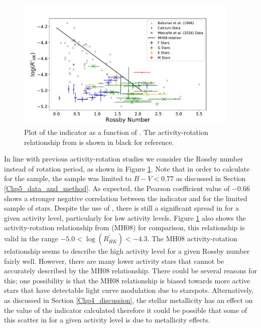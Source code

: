 \begin{figure}
    \centering
    \includegraphics[width=0.95\textwidth]{Figures/5-Activity_rotation/rhk_v_r0.pdf}
    \caption[\Rprime indicator as a function of \Ro]{Plot of the \Rprime indicator as a function of \Ro. The activity-rotation relationship from \citet{Mamajek_Hillenbrand_2008} is shown in black for reference.}
    \label{fig:rhk_v_ro}
\end{figure}

In line with previous activity-rotation studies \citep{Mamajek_Hillenbrand_2008,Metcalfe_etal_2016} we consider the Rossby number instead of rotation period, as shown in Figure \ref{fig:rhk_v_ro}. Note that in order to calculate \Ro for the \citet{Baliunas_etal_1996} sample, the sample was limited to $B-V < 0.77$ as discussed in Section \ref{Chp5_data_and_method}. As expected, the Pearson coefficient value of $-0.66$ shows a stronger negative correlation between the \Rprime indicator and \Ro for the limited \citet{Baliunas_etal_1996} sample of stars. Despite the use of \Ro, there is still a significant spread in \Ro for a given activity level, particularly for low activity levels. Figure \ref{fig:rhk_v_ro} also shows the activity-rotation relationship from \citet{Mamajek_Hillenbrand_2008} (MH08) for comparison, this relationship is valid in the range $-5.0 < \log(R^{'}_{HK}) < -4.3$. The MH08 activity-rotation relationship seems to describe the high activity level for a given Rossby number fairly well. However, there are many lower activity stars that cannot be accurately described by the MH08 relationship. There could be several reasons for this; one possibility is that the MH08 relationship is biased towards more active stars that have detectable light curve modulation due to starspots. Alternatively, as discussed in Section \ref{Chp4_discussion}, the stellar metallicity has an effect on the value of the \Rprime indicator calculated therefore it could be possible that some of this scatter in \Ro for a given activity level is due to metallicity effects.

